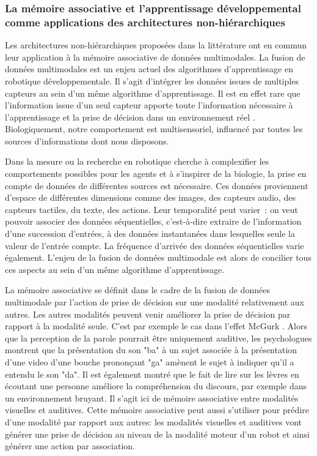 \documentclass[../main]{subfiles}
\begin{document}
{\subsubsection{La mémoire associative et l'apprentissage développemental comme applications des architectures non-hiérarchiques}

Les architectures non-hiérarchiques proposées dans la littérature ont en commun leur application à la mémoire associative de données multimodales.
La fusion de données multimodales est un enjeu actuel des algorithmes d'apprentissage en robotique développementale.
Il s'agit d'intégrer les données issues de multiples capteurs au sein d'un même algorithme d'apprentissage.
Il est en effet rare que l'information issue d'un seul capteur apporte toute l'information nécessaire à l'apprentissage et la prise de décision dans un environnement réel \cite{lahat2015}. Biologiquement, notre comportement est multisensoriel, influencé par toutes les sources d'informations dont nous disposons.

Dans la mesure ou la recherche en robotique cherche à complexifier les comportements possibles pour les agents et à s'inspirer de la biologie, la prise en compte de données de différentes sources est nécessaire. Ces données proviennent d'espace de différentes dimensions comme des images, des capteurs audio, des capteurs tactiles, du texte, des actions. Leur temporalité peut varier~: on veut pouvoir associer des données séquentielles, c'est-à-dire extraire de l'information d'une succession d'entrées, à des données instantanées dans lesquelles seule la valeur de l'entrée compte. La fréquence d'arrivée des données séquentielles varie également.
L'enjeu de la fusion de données multimodale est alors de concilier tous ces aspects au sein d'un même algorithme d'apprentissage.

La mémoire associative se définit dans le cadre de la fusion de données multimodale par l'action de prise de décision sur une modalité relativement aux autres.
Les autres modalités peuvent venir améliorer la prise de décision par rapport à la modalité seule. C'est par exemple le cas dans l'effet McGurk \cite{McGurk1976HearingLA}. Alors que la perception de la parole pourrait être uniquement auditive, les psychologues montrent que la présentation du son "ba" à un sujet associée à la présentation d'une video d'une bouche prononçant "ga" amènent le sujet à indiquer qu'il a entendu le son "da". Il est également montré que le fait de lire sur les lèvres en écoutant une personne améliore la compréhension du discours, par exemple dans un environnement bruyant. Il s'agit ici de mémoire associative entre modalités visuelles et auditives.
Cette mémoire associative peut aussi s'utiliser pour prédire d'une modalité par rapport aux autres: les modalités visuelles et auditives vont générer une prise de décision au niveau de la modalité moteur d'un robot et ainsi générer une action par association.

}
\end{document}
